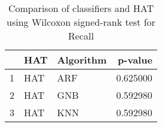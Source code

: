 \begin{table}
\footnotesize
\caption{Comparison of classifiers and HAT using Wilcoxon signed-rank test for Recall}
\label{tab:HAT wilcoxon Recall comparison}
\begin{tabular}{lllr}
\hline
 & HAT & Algorithm & p-value \\
\hline
1 & HAT & ARF & 0.625000 \\
2 & HAT & GNB & 0.592980 \\
3 & HAT & KNN & 0.592980 \\
\hline
\end{tabular}
\end{table}

